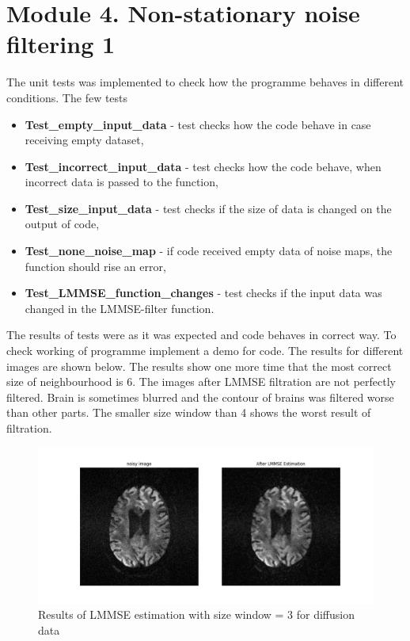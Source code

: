 \section{Module 4. Non-stationary noise filtering 1}

The unit tests was implemented to check how the programme behaves in different conditions. The few tests

\begin{itemize}

	\item \textbf{Test\_empty\_input\_data} - test checks how the code behave in case receiving empty dataset,
	\item \textbf{Test\_incorrect\_input\_data} - test checks how the code behave, when incorrect data is passed to the function,
	\item \textbf{Test\_size\_input\_data} - test checks if the size of data is changed on the output of code,
	\item \textbf{Test\_none\_noise\_map} - if code received empty data of noise maps, the function should rise an error,
	\item \textbf{Test\_LMMSE\_function\_changes} - test checks if the input data was changed in the LMMSE-filter function.

\end{itemize}

The results of tests were as it was expected and code behaves in correct way. To check working of programme implement a demo for code. The results for different images are shown below. The results show one more time that the most correct size of neighbourhood is 6. The images after LMMSE filtration are not perfectly filtered. Brain is sometimes blurred and the contour of brains was filtered worse than other parts. The smaller size window than 4 shows the worst result of filtration. 

\begin{figure}[H]
\centering{}\includegraphics[scale=0.5]{figures/Module_4/diff3}\caption{Results of LMMSE estimation with size window = 3 for diffusion data} \label{fig:figures/Module_4/diff3}
\end{figure}

